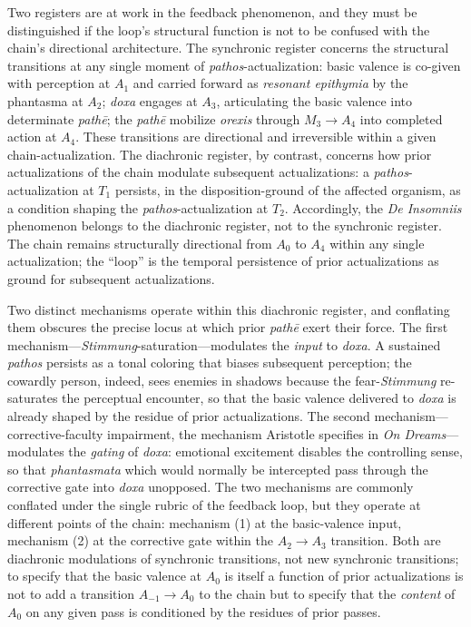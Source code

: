 \documentclass{article}
\begin{document}
Two registers are at work in the feedback phenomenon, and they must be distinguished if the loop's structural function is not to be confused with the chain's directional architecture. The synchronic register concerns the structural transitions at any single moment of \textit{pathos}-actualization: basic valence is co-given with perception at $A_1$ and carried forward as \textit{resonant epithymia} by the phantasma at $A_2$; \textit{doxa} engages at $A_3$, articulating the basic valence into determinate \textit{path\=e}; the \textit{path\=e} mobilize \textit{orexis} through $M_3 \rightarrow A_4$ into completed action at $A_4$. These transitions are directional and irreversible within a given chain-actualization. The diachronic register, by contrast, concerns how prior actualizations of the chain modulate subsequent actualizations: a \textit{pathos}-actualization at $T_1$ persists, in the disposition-ground of the affected organism, as a condition shaping the \textit{pathos}-actualization at $T_2$. Accordingly, the \textit{De Insomniis} phenomenon belongs to the diachronic register, not to the synchronic register. The chain remains structurally directional from $A_0$ to $A_4$ within any single actualization; the ``loop'' is the temporal persistence of prior actualizations as ground for subsequent actualizations.

Two distinct mechanisms operate within this diachronic register, and conflating them obscures the precise locus at which prior \textit{path\=e} exert their force. The first mechanism---\textit{Stimmung}-saturation---modulates the \textit{input} to \textit{doxa}. A sustained \textit{pathos} persists as a tonal coloring that biases subsequent perception; the cowardly person, indeed, sees enemies in shadows because the fear-\textit{Stimmung} re-saturates the perceptual encounter, so that the basic valence delivered to \textit{doxa} is already shaped by the residue of prior actualizations. The second mechanism---corrective-faculty impairment, the mechanism Aristotle specifies in \textit{On Dreams}---modulates the \textit{gating} of \textit{doxa}: emotional excitement disables the controlling sense, so that \textit{phantasmata} which would normally be intercepted pass through the corrective gate into \textit{doxa} unopposed. The two mechanisms are commonly conflated under the single rubric of the feedback loop, but they operate at different points of the chain: mechanism (1) at the basic-valence input, mechanism (2) at the corrective gate within the $A_2 \rightarrow A_3$ transition. Both are diachronic modulations of synchronic transitions, not new synchronic transitions; to specify that the basic valence at $A_0$ is itself a function of prior actualizations is not to add a transition $A_{-1} \rightarrow A_0$ to the chain but to specify that the \textit{content} of $A_0$ on any given pass is conditioned by the residues of prior passes.
\end{document}
